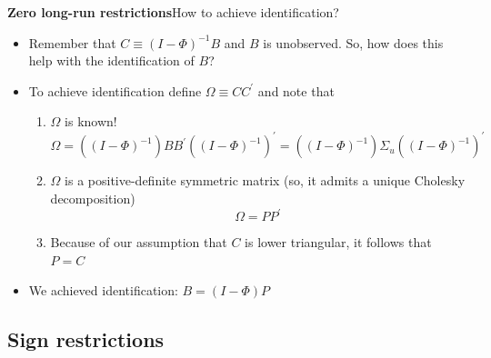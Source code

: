 \documentclass[10pt,english,t,aspectratio=169,ignorenonframetext]{beamer}
\begin{document}
\begin{frame}
{\textbf{Zero long-run restrictions}}{How to achieve identification?}%
\smallskip

\begin{itemize}
\item Remember that $C\equiv \left( I-\Phi \right) ^{-1}B$ and $B$ is
unobserved. So, how does this help with the identification of $B$?\bigskip 
\pause

\item To achieve identification define $\Omega \equiv CC^{\prime }$ and note
that\smallskip

\begin{enumerate}
\item $\Omega $ is known!%
\begin{equation*}
\Omega =\left( \left( I-\Phi \right) ^{-1}\right) BB^{\prime }\left( \left(
I-\Phi \right) ^{-1}\right) ^{\prime }=\left( \left( I-\Phi \right)
^{-1}\right) \Sigma _{u}\left( \left( I-\Phi \right) ^{-1}\right) ^{\prime }
\end{equation*}%
\pause

\item $\Omega $ is a positive-definite symmetric matrix (so, it admits a
unique Cholesky decomposition)%
\begin{equation*}
\Omega =PP^{\prime }
\end{equation*}%
\pause\vspace{-0.15cm}

\item Because of our assumption that $C$ is lower triangular, it follows
that $P=C$\bigskip \pause
\end{enumerate}

\item We achieved identification: $B=\left( I-\Phi \right) P$
\end{itemize}
\end{frame}


\subsection{Sign restrictions}

\begin{frame}
\vspace{3cm} \color{title}\bigskip

\color{note}
\end{frame}
\end{document}
